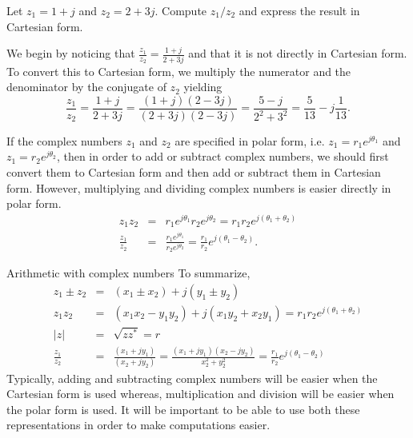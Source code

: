 \begin{example}
Let $z_1 = 1+j$ and $z_2 = 2 + 3j$. Compute $z_1/z_2$ and express the result in Cartesian form.

We begin by noticing that $\frac{z_1}{z_2} = \frac{1+j}{2+3j}$ and that it is not directly in Cartesian form.
To convert this to Cartesian form, we multiply the numerator and the denominator by the conjugate of $z_2$ yielding
\[
\frac{z_1}{z_2} = \frac{1+j}{2+3j} = \frac{(1+j)(2-3j)}{(2+3j)(2-3j)} = \frac{5-j}{2^2+3^2} = \frac{5}{13} - j \frac{1}{13}.
\]
\end{example}

If the complex numbers $z_1$ and $z_2$ are specified in polar form, i.e. $z_1 = r_1 e^{j \theta_1}$ and $z_1 = r_2 e^{j \theta_2}$, then in order to add or subtract complex numbers,
we should first convert them to Cartesian form and then add or subtract them in Cartesian form.
However, multiplying and dividing complex numbers is easier directly in polar form. 
\begin{eqnarray}
z_1 z_2 & = & r_1 e^{j \theta_1} r_2 e^{j \theta_2} = r_1 r_2 e^{j (\theta_1+\theta_2)} \\
\frac{z_1}{z_2} & = & \frac{r_1 e^{j \theta_1}}{r_2 e^{j \theta_2}} = 
\frac{r_1}{r_2} e^{j (\theta_1 - \theta_2)}.
\end{eqnarray}

\begin{infobox}{Arithmetic with complex numbers}
To summarize,
\begin{eqnarray}
\label{eqn:complexadd} z_1 \pm z_2 & = & (x_1 \pm x_2) + j (y_1 \pm y_2) \\
\label{eqn:complexmult} z_1 z_2 & = & (x_1 x_2 - y_1 y_2) + j (x_1 y_2 + x_2 y_1) = r_1 r_2 e^{j (\theta_1+\theta_2)} \\
\nonumber |z| &=& \sqrt{zz^*} = r\\
\nonumber \frac{z_1}{z_2} &=& \frac{(x_1+jy_1)}{(x_2+jy_2)} = \frac{(x_1+jy_1)(x_2-jy_2)}{x_2^2+y_2^2} = \frac{r_1}{r_2} e^{j (\theta_1-\theta_2)}
\end{eqnarray}
Typically, adding and subtracting complex numbers will be easier when the Cartesian form is used whereas, multiplication and division will be easier when the polar form is used. It will be important to be able to use both these representations in order to make computations easier.
\end{infobox}


